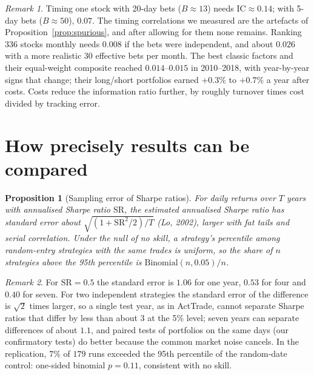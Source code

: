 \documentclass[11pt,a4paper]{article}
\newtheorem{proposition}{Proposition}
\theoremstyle{remark}
\newtheorem*{remark}{Remark}
\newcommand{\SR}{\mathrm{SR}}
\begin{document}
\begin{remark}
Timing one stock with 20-day bets ($B\approx13$) needs $\mathrm{IC}\approx0.14$; with 5-day bets ($B\approx50$), $0.07$. The timing correlations we measured are the artefacts of Proposition~\ref{prop:spurious}, and after allowing for them none remains. Ranking $336$ stocks monthly needs $0.008$ if the bets were independent, and about $0.026$ with a more realistic $30$ effective bets per month. The best classic factors and their equal-weight composite reached $0.014$--$0.015$ in 2010--2018, with year-by-year signs that change; their long/short portfolios earned $+0.3\%$ to $+0.7\%$ a year after costs. Costs reduce the information ratio further, by roughly turnover times cost divided by tracking error.
\end{remark}

\section{How precisely results can be compared}

\begin{proposition}[Sampling error of Sharpe ratios]\label{prop:se}
For daily returns over $T$ years with annualised Sharpe ratio $\SR$, the estimated annualised Sharpe ratio has standard error about $\sqrt{(1+\SR^2/2)/T}$ (Lo, 2002), larger with fat tails and serial correlation. Under the null of no skill, a strategy's percentile among random-entry strategies with the same trades is uniform, so the share of $n$ strategies above the 95th percentile is $\mathrm{Binomial}(n,0.05)/n$.
\end{proposition}

\begin{remark}
For $\SR=0.5$ the standard error is $1.06$ for one year, $0.53$ for four and $0.40$ for seven. For two independent strategies the standard error of the difference is $\sqrt2$ times larger, so a single test year, as in ActTrade, cannot separate Sharpe ratios that differ by less than about $3$ at the 5\% level; seven years can separate differences of about $1.1$, and paired tests of portfolios on the same days (our confirmatory tests) do better because the common market noise cancels. In the replication, $7\%$ of $179$ runs exceeded the 95th percentile of the random-date control: one-sided binomial $p=0.11$, consistent with no skill.
\end{remark}
\end{document}
